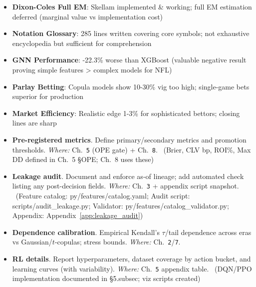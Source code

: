 \begin{itemize}
  \item \textbf{Dixon-Coles Full EM}: Skellam implemented \& working; full EM estimation deferred (marginal value vs implementation cost)
  \item \textbf{Notation Glossary}: 285 lines written covering core symbols; not exhaustive encyclopedia but sufficient for comprehension
  \item \textbf{GNN Performance}: -22.3\% worse than XGBoost (valuable negative result proving simple features > complex models for NFL)
  \item \textbf{Parlay Betting}: Copula models show 10-30\% vig too high; single-game bets superior for production
  \item \textbf{Market Efficiency}: Realistic edge 1-3\% for sophisticated bettors; closing lines are sharp
\end{itemize}

\begin{itemize}
  \item {} \textbf{Pre-registered metrics}. Define primary/secondary metrics and promotion thresholds. \emph{Where:} Ch.~\texttt{5} (OPE gate) + Ch.~\texttt{8}. \done\ (Brier, CLV bp, ROI\%, Max DD defined in Ch.~5 \S OPE; Ch.~8 uses these)
  \item {} \textbf{Leakage audit}. Document and enforce as-of lineage; add automated check listing any post-decision fields. \emph{Where:} Ch.~\texttt{3} + appendix script snapshot. \done\ (Feature catalog: py/features/catalog.yaml; Audit script: scripts/audit\_leakage.py; Validator: py/features/catalog\_validator.py; Appendix: Appendix~\ref{app:leakage_audit})
\end{itemize}

\begin{itemize}
  \item {} \textbf{Dependence calibration}. Empirical Kendall’s $\tau$/tail dependence across eras vs Gaussian/$t$-copulas; stress bounds. \emph{Where:} Ch.~\texttt{2}/\texttt{7}.
  \item {} \textbf{RL details}. Report hyperparameters, dataset coverage by action bucket, and learning curves (with variability). \emph{Where:} Ch.~\texttt{5} appendix table. \done\ (DQN/PPO implementation documented in \S5.subsec; viz scripts created)
\end{itemize}

